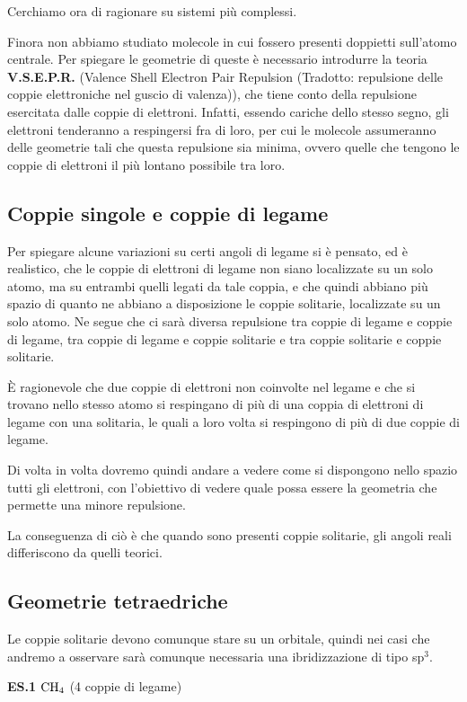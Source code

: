 Cerchiamo ora di ragionare su sistemi più complessi.

Finora non abbiamo studiato molecole in cui fossero presenti doppietti sull'atomo centrale. Per spiegare le geometrie di queste è necessario introdurre la teoria \textbf{V.S.E.P.R.} (Valence Shell Electron Pair Repulsion (Tradotto: repulsione delle coppie elettroniche nel guscio di valenza)), che tiene conto della repulsione esercitata dalle coppie di elettroni. Infatti, essendo cariche dello stesso segno, gli elettroni tenderanno a respingersi fra di loro, per cui le molecole assumeranno delle geometrie tali che questa repulsione sia minima, ovvero quelle che tengono le coppie di elettroni il più lontano possibile tra loro.
\subsection{Coppie singole e coppie di legame}
Per spiegare alcune variazioni su certi angoli di legame si è pensato, ed è realistico, che le coppie di elettroni di legame non siano localizzate su un solo atomo, ma su entrambi quelli legati da tale coppia, e che quindi abbiano più spazio di quanto ne abbiano a disposizione le coppie solitarie, localizzate su un solo atomo. Ne segue che ci sarà diversa repulsione tra coppie di legame e coppie di legame, tra coppie di legame e coppie solitarie e tra coppie solitarie e coppie solitarie.

È ragionevole che due coppie di elettroni non coinvolte nel legame e che si trovano nello stesso atomo si respingano di più di una coppia di elettroni di legame con una solitaria, le quali a loro volta si respingono di più di due coppie di legame.

Di volta in volta dovremo quindi andare a vedere come si dispongono nello spazio tutti gli elettroni, con l'obiettivo di vedere quale possa essere la geometria che permette una minore repulsione.

La conseguenza di ciò è che quando sono presenti coppie solitarie, gli angoli reali differiscono da quelli teorici.
\subsection{Geometrie tetraedriche}
Le coppie solitarie devono comunque stare su un orbitale, quindi nei casi che andremo a osservare sarà comunque necessaria una ibridizzazione di tipo sp$^3$.

\vspace{0.2cm}\textbf{ES.1} $\rm CH_4$ (4 coppie di legame)
    
